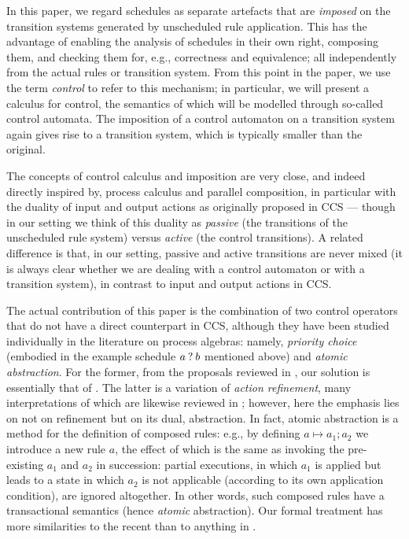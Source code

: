 In this paper, we regard schedules as separate artefacts that are \emph{imposed} on the transition systems generated by unscheduled rule application. This has the advantage of enabling the analysis of schedules in their own right, composing them, and checking them for, e.g., correctness and equivalence; all independently from the actual rules or transition system. From this point in the paper, we use the term \emph{control} to refer to this mechanism; in particular, we will present a calculus for control, the semantics of which will be modelled through so-called control automata. The imposition of a control automaton on a transition system again gives rise to a transition system, which is typically smaller than the original.

The concepts of control calculus and imposition are very close, and indeed directly inspired by, process calculus and parallel composition, in particular with the duality of input and output actions as originally proposed in CCS \cite{CCS} --- though in our setting we think of this duality as \emph{passive} (the transitions of the unscheduled rule system) versus \emph{active} (the control transitions). A related difference is that, in our setting, passive and active transitions are never mixed (it is always clear whether we are dealing with a control automaton or with a transition system), in contrast to input and output actions in CCS.

The actual contribution of this paper is the combination of two control operators that do not have a direct counterpart in CCS, although they have been studied individually in the literature on process algebras: namely, \emph{priority choice} (embodied in the example schedule $a\mathbin{?} b$ mentioned above) and \emph{atomic abstraction}. For the former, from the proposals reviewed in \cite{Handbook-priority}, our solution is essentially that of \cite{PriorityChoice}. The latter is a variation of \emph{action refinement}, many interpretations of which are likewise reviewed in \cite{Handbook-refinement}; however, here the emphasis lies on not on refinement but on its dual, abstraction. In fact, atomic abstraction is a method for the definition of composed rules: e.g., by defining $a\mapsto a_1;a_2$ we introduce a new rule $a$, the effect of which is the same as invoking the pre-existing $a_1$ and $a_2$ in succession: partial executions, in which $a_1$ is applied but leads to a state in which $a_2$ is not applicable (according to its own application condition), are ignored altogether. In other words, such composed rules have a transactional semantics (hence \emph{atomic} abstraction). Our formal treatment has more similarities to the recent \cite{Vaandrager} than to anything in \cite{Handbook-refinement}.

